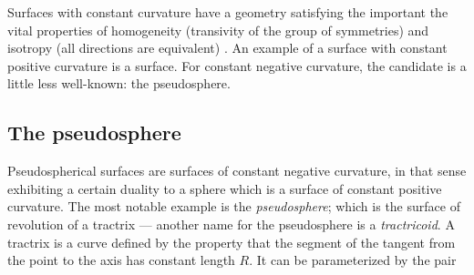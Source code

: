 Surfaces with constant curvature have a geometry satisfying the important the vital properties of homogeneity (transivity of the group of symmetries) and isotropy (all directions are equivalent) \cite{Thurston1997}. An example of a surface with constant positive curvature is a surface. For constant negative curvature, the candidate is a little less well-known: the pseudosphere.

\subsection{The pseudosphere}
Pseudospherical surfaces are surfaces of constant negative curvature, in that sense exhibiting a certain duality to a sphere which is a surface of constant positive curvature. The most notable example is the \emph{pseudosphere}; which is the surface of revolution of a tractrix --- another name for the pseudosphere is a \emph{tractricoid}. A tractrix is a curve defined by the property that the segment of the tangent from the point to the axis has constant length $R$. It can be parameterized by the pair


